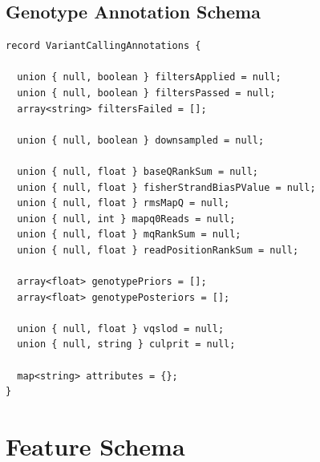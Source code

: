 \documentclass[phd]{ucbthesis}
\begin{document}
\subsection{Genotype Annotation Schema}
\label{sec:genotype-annotation-schema}

\begin{lstlisting}[caption={ADAM} genotype annotation schema]
record VariantCallingAnnotations {

  union { null, boolean } filtersApplied = null;
  union { null, boolean } filtersPassed = null;
  array<string> filtersFailed = [];

  union { null, boolean } downsampled = null;

  union { null, float } baseQRankSum = null;
  union { null, float } fisherStrandBiasPValue = null;
  union { null, float } rmsMapQ = null;
  union { null, int } mapq0Reads = null;
  union { null, float } mqRankSum = null;
  union { null, float } readPositionRankSum = null;

  array<float> genotypePriors = [];
  array<float> genotypePosteriors = [];

  union { null, float } vqslod = null;
  union { null, string } culprit = null;

  map<string> attributes = {};
}
\end{lstlisting}

\section{Feature Schema}
\label{sec:feature-schema}
\end{document}
